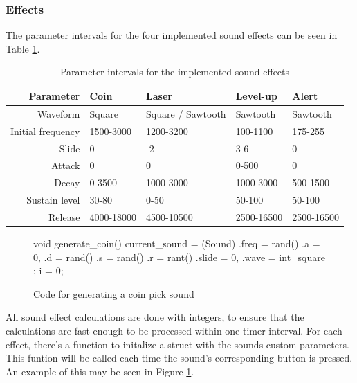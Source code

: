 \subsubsection{Effects}

The parameter intervals for the four implemented sound effects can be seen in Table \ref{tab:sound_effects}.

\begin{table}[ht!]
    \begin{center}
    \begin{tabular}{r|llll}
    Parameter         & Coin       & Laser             & Level-up   & Alert      \\
    \hline
    Waveform          & Square     & Square / Sawtooth & Sawtooth   & Sawtooth   \\
    Initial frequency & 1500-3000  & 1200-3200         & 100-1100   & 175-255    \\
    Slide             & 0          & -2                & 3-6        & 0          \\
    Attack            & 0          & 0                 & 0-500      & 0          \\
    Decay             & 0-3500     & 1000-3000         & 1000-3000  & 500-1500   \\
    Sustain level     & 30-80      & 0-50              & 50-100     & 50-100     \\
    Release           & 4000-18000 & 4500-10500        & 2500-16500 & 2500-16500 \\
    \end{tabular}
    \end{center}
    \caption{Parameter intervals for the implemented sound effects}
    \label{tab:sound_effects}
\end{table}

\begin{figure}[ht!]
\begin{code}
void generate_coin() {
    current_sound = (Sound){
        .freq = rand() %
        .a = 0,
        .d = rand() %
        .s = rand() %
        .r = rant() %
        .slide = 0,
        .wave = int_square
    };
    i = 0;
}
\end{code}
\caption{Code for generating a coin pick sound}
\label{fig:coin}
\end{figure}

All sound effect calculations are done with integers, to ensure that the calculations are fast enough to be processed within one timer interval.
For each effect, there's a function to initalize a struct with the sounds custom parameters. This funtion will be called each time the sound's corresponding button is pressed. An example of this may be seen in Figure \ref{fig:coin}.

